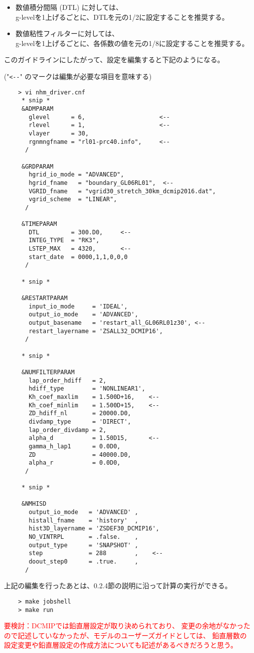  \begin{itemize}
   \item 数値積分間隔 (DTL) に対しては、 \\
   {\sf g-levelを1上げるごとに、DTLを元の1/2に設定することを推奨する}。
   \item 数値粘性フィルターに対しては、 \\
   {\sf g-levelを1上げるごとに、各係数の値を元の1/8に設定することを推奨する}。 \\
 \end{itemize}

 \noindent このガイドラインにしたがって、設定を編集すると下記のようになる。

 ("\verb|<--|" のマークは編集が必要な項目を意味する)
 \begin{verbatim}
    > vi nhm_driver.cnf
     * snip *
     &ADMPARAM
       glevel      = 6,                     <--
       rlevel      = 1,                     <--
       vlayer      = 30,
       rgnmngfname = "rl01-prc40.info",     <--
      /

     &GRDPARAM
       hgrid_io_mode = "ADVANCED",
       hgrid_fname   = "boundary_GL06RL01",  <--
       VGRID_fname   = "vgrid30_stretch_30km_dcmip2016.dat",
       vgrid_scheme  = "LINEAR",
      /

     &TIMEPARAM
       DTL         = 300.D0,     <--
       INTEG_TYPE  = "RK3",
       LSTEP_MAX   = 4320,       <--
       start_date  = 0000,1,1,0,0,0
      /

     * snip *

     &RESTARTPARAM
       input_io_mode     = 'IDEAL',
       output_io_mode    = 'ADVANCED',
       output_basename   = 'restart_all_GL06RL01z30', <--
       restart_layername = 'ZSALL32_DCMIP16',
      /

     * snip *

     &NUMFILTERPARAM
       lap_order_hdiff   = 2,
       hdiff_type        = 'NONLINEAR1',
       Kh_coef_maxlim    = 1.500D+16,    <--
       Kh_coef_minlim    = 1.500D+15,    <--
       ZD_hdiff_nl       = 20000.D0,
       divdamp_type      = 'DIRECT',
       lap_order_divdamp = 2,
       alpha_d           = 1.50D15,      <--
       gamma_h_lap1      = 0.0D0,
       ZD                = 40000.D0,
       alpha_r           = 0.0D0,
      /

     * snip *

     &NMHISD
       output_io_mode   = 'ADVANCED' ,
       histall_fname    = 'history'  ,
       hist3D_layername = 'ZSDEF30_DCMIP16',
       NO_VINTRPL       = .false.    ,
       output_type      = 'SNAPSHOT' ,
       step             = 288        ,    <--
       doout_step0      = .true.     ,
      /
 \end{verbatim}

 \noindent 上記の編集を行ったあとは、0.2.4節の説明に沿って計算の実行ができる。
 \begin{verbatim}
    > make jobshell
    > make run
 \end{verbatim}


\textcolor{red}{要検討：DCMIPでは鉛直層設定が取り決められており、
変更の余地がなかったので記述していなかったが、モデルのユーザーズガイドとしては、
鉛直層数の設定変更や鉛直層設定の作成方法についても記述があるべきだろうと思う。}
